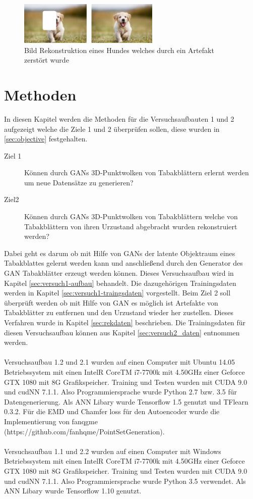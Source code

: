\documentclass{llncs}
\begin{document}
\begin{figure}[htbp] 
	\centering
	\includegraphics[width=0.6\textwidth]{imagere.png}
	\caption{Bild Rekonstruktion eines Hundes welches durch ein Artefakt zerstört wurde}
	\label{fig:Bild40}
\end{figure}
\newpage
\section{Methoden}
In diesen Kapitel werden die Methoden für die Versuchsaufbauten 1 und 2 aufgezeigt welche die Ziele 1 und 2 überprüfen sollen, diese wurden in \ref{sec:objective} festgehalten.

\begin{description}
	\item[Ziel 1]
	Können durch GANs 3D-Punktwolken von Tabakblättern erlernt werden um neue Datensätze zu generieren?\\
	\item[Ziel2] Können durch GANs 3D-Punktwolken von Tabakblättern welche von Tabakblättern von ihren Urzustand abgebracht wurden rekonstruiert werden? 
\end{description}

Dabei geht es darum ob mit Hilfe von GANs der latente Objektraum eines Tabakblattes gelernt werden kann und anschließend durch den Generator des GAN Tabakblätter erzeugt werden können. Dieses Versuchsaufbau wird in Kapitel \ref{sec:versuch1-aufbau} behandelt. Die dazugehörigen Trainingsdaten werden in Kapitel \ref{sec:versuch1-traingsdaten} vorgestellt. Beim Ziel 2 soll überprüft werden ob mit Hilfe von GAN es möglich ist Artefakte von Tabakblätter zu entfernen und den Urzustand wieder her zustellen.  Dieses Verfahren wurde in Kapitel \ref{sec:rekdaten} beschrieben. Die Trainingsdaten für diesen Versuchsaufbau können aus Kapitel \ref{sec:versuch2_daten} entnommen werden. 
\\\\
Versuchsaufbau 1.2 und 2.1 wurden auf einen Computer mit Ubuntu 14.05 Betriebssystem mit einen IntelR CoreTM i7-7700k mit 4.50GHz einer Geforce GTX 1080 mit 8G Grafikspeicher. Training und Testen wurden mit CUDA 9.0 und cudNN 7.1.1. Also Programmiersprache wurde Python 2.7 bzw. 3.5 für Datengenerierung. Als ANN Libary wurde Tensorflow 1.5 genutzt und TFlearn 0.3.2. Für die EMD und Chamfer loss für den Autoencoder wurde die Implementierung von fanqgme (https://github.com/fanhqme/PointSetGeneration).
\\\\
Versuchsaufbau 1.1 und 2.2  wurden auf einen Computer mit Windows Betriebssystem mit einen IntelR CoreTM i7-7700k mit 4.50GHz einer Geforce GTX 1080 mit 8G Grafikspeicher. Training und Testen wurden mit CUDA 9.0 und cudNN 7.1.1. Also Programmiersprache wurde Python 3.5 verwendet. Als ANN Libary wurde Tensorflow 1.10 genutzt.
\end{document}
